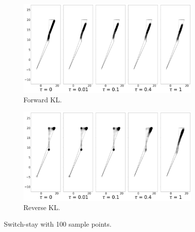 \documentclass{article}
\begin{document}
\begin{figure}[!htb]
  \centering
  \begin{subfigure}[b]{0.5\linewidth}
    \centering
    \includegraphics[width=0.8\columnwidth]{figs/continuous-switch-stay/monte-carlo/100/polytope_forward_optim=adam_lr=0.005.png}
    \caption{Forward KL.}
    \label{fig:100-sample-switch-stay-forward}
  \end{subfigure}%
  \begin{subfigure}[b]{0.5\linewidth}
        \centering
        \includegraphics[width=0.8\columnwidth]{figs/continuous-switch-stay/monte-carlo/100/polytope_reverse_optim=adam_lr=0.005.png}
        \caption{Reverse KL.}
        \label{fig:100-sample-switch-stay-reverse}
  \end{subfigure}
  \caption{Switch-stay with 100 sample points.}
\end{figure}
\end{document}
